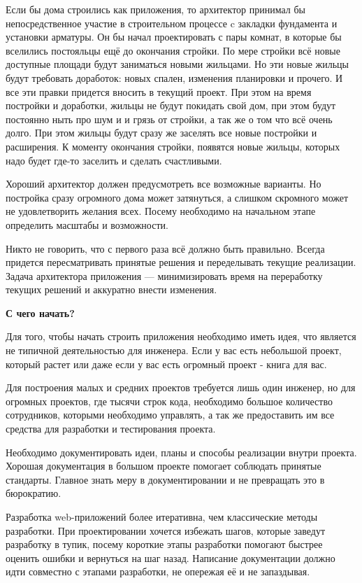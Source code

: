 
Если бы дома строились как приложения, то архитектор принимал бы непосредственное участие в строительном процессе c закладки фундамента и установки арматуры.  Он бы начал проектировать с пары комнат, в которые бы вселились постояльцы ещё до окончания стройки. По мере стройки всё новые доступные площади будут заниматься новыми жильцами. Но эти новые жильцы будут требовать доработок: новых спален, изменения планировки и прочего. И все эти правки придется вносить в текущий проект. При этом на время постройки и доработки, жильцы не будут покидать свой дом, при этом будут постоянно ныть про шум и и грязь от стройки, а так же о том что всё очень долго. При этом жильцы будут сразу же заселять все новые постройки и расширения. К моменту окончания стройки, появятся новые жильцы, которых надо будет где-то заселить и сделать счастливыми.

Хороший архитектор должен предусмотреть все возможные варианты. Но постройка сразу огромного дома может затянуться, а слишком скромного может не удовлетворить желания всех. Посему необходимо на начальном этапе определить масштабы и возможности.

Никто не говорить, что с первого раза всё должно быть правильно. Всегда придется пересматривать принятые решения и переделывать текущие реализации. Задача архитектора приложения --- минимизировать время на переработку текущих решений и аккуратно внести изменения.

\textbf{С чего начать?}

Для того, чтобы начать строить приложения необходимо иметь идея, что является не типичной деятельностью для инженера. Если у вас есть небольшой проект, который растет или даже если у вас есть огромный проект - книга для вас.

Для построения малых и средних проектов требуется лишь один инженер, но для огромных проектов, где тысячи строк кода, необходимо большое количество сотрудников, которыми необходимо управлять, а так же предоставить им все средства для разработки и тестирования проекта. 


Необходимо документировать идеи, планы и способы реализации внутри проекта. Хорошая документация в большом проекте помогает соблюдать принятые стандарты. Главное знать меру в документировании и не превращать это в бюрократию.

Разработка web-приложений более итеративна, чем классические методы разработки.  При проектировании хочется избежать шагов, которые заведут разработку в тупик, посему короткие этапы разработки помогают быстрее оценить ошибки и вернуться на шаг назад. Написание документации должно идти совместно с этапами разработки, не опережая её и не запаздывая.







\clearpage